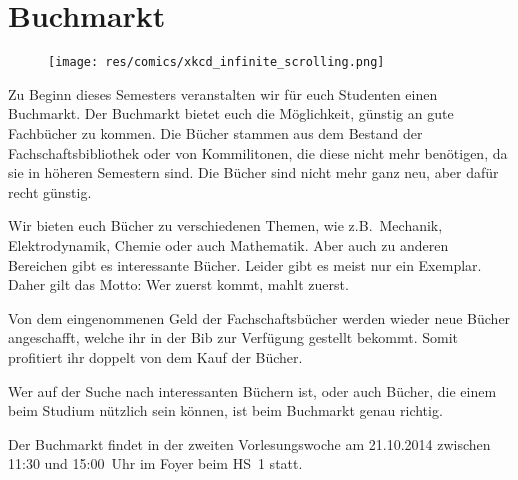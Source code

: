 
\section{Buchmarkt}
\begin{multicols*}{2}
{%

\begin{wrapfigure}{r}{0cm}
\texttt{[image: res/comics/xkcd\_infinite\_scrolling.png]}
\end{wrapfigure}
Zu Beginn dieses Semesters veranstalten wir für euch Studenten einen Buchmarkt. Der Buchmarkt bietet euch die Möglichkeit, günstig an gute Fachbücher zu kommen. Die Bücher stammen aus dem Bestand der Fachschaftsbibliothek oder von Kommilitonen, die diese nicht mehr benötigen, da sie in höheren Semestern sind. Die Bücher sind nicht mehr ganz neu, aber dafür recht günstig.

Wir bieten euch Bücher zu verschiedenen Themen, wie z.B.\ Mechanik, Elektrodynamik, Chemie oder auch Mathematik. Aber auch zu anderen Bereichen gibt es interessante Bücher. Leider gibt es meist nur ein Exemplar. Daher gilt das Motto: Wer zuerst kommt, mahlt zuerst.}

Von dem eingenommenen Geld der Fachschaftsbücher werden wieder neue Bücher angeschafft, welche ihr in der Bib zur Verfügung gestellt bekommt. Somit profitiert ihr doppelt von dem Kauf der Bücher.

Wer auf der Suche nach interessanten Büchern ist, oder auch Bücher, die einem beim Studium nützlich sein können, ist beim Buchmarkt genau richtig.

Der Buchmarkt findet in der zweiten Vorlesungswoche am 21.10.2014 zwischen 11:30 und 15:00~Uhr im Foyer beim HS~1 statt.

\end{multicols*}


